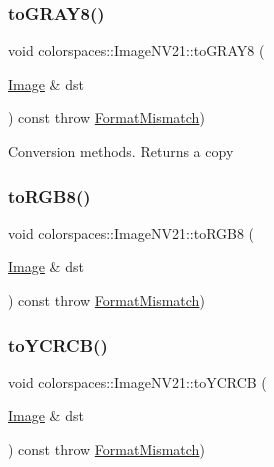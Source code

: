 \mbox{\label{classcolorspaces_1_1_image_n_v21_a0df5a2e9fb72b96e27926690be766b64}} 
\subsubsection{\texorpdfstring{to\+G\+R\+A\+Y8()}{toGRAY8()}}
{\footnotesize\ttfamily void colorspaces\+::\+Image\+N\+V21\+::to\+G\+R\+A\+Y8 (\begin{DoxyParamCaption}\item[{\hyperlink{classcolorspaces_1_1_image}{Image} \&}]{dst }\end{DoxyParamCaption}) const throw  \hyperlink{classcolorspaces_1_1_image_1_1_format_mismatch}{Format\+Mismatch}) }

Conversion methods. Returns a copy \mbox{\label{classcolorspaces_1_1_image_n_v21_a2f516ceb85bd1151bed2fa940fee133c}} 
\subsubsection{\texorpdfstring{to\+R\+G\+B8()}{toRGB8()}}
{\footnotesize\ttfamily void colorspaces\+::\+Image\+N\+V21\+::to\+R\+G\+B8 (\begin{DoxyParamCaption}\item[{\hyperlink{classcolorspaces_1_1_image}{Image} \&}]{dst }\end{DoxyParamCaption}) const throw  \hyperlink{classcolorspaces_1_1_image_1_1_format_mismatch}{Format\+Mismatch}) }

\mbox{\label{classcolorspaces_1_1_image_n_v21_accca097e4cca85e511a1bedcba198549}} 
\subsubsection{\texorpdfstring{to\+Y\+C\+R\+C\+B()}{toYCRCB()}}
{\footnotesize\ttfamily void colorspaces\+::\+Image\+N\+V21\+::to\+Y\+C\+R\+CB (\begin{DoxyParamCaption}\item[{\hyperlink{classcolorspaces_1_1_image}{Image} \&}]{dst }\end{DoxyParamCaption}) const throw  \hyperlink{classcolorspaces_1_1_image_1_1_format_mismatch}{Format\+Mismatch}) }



